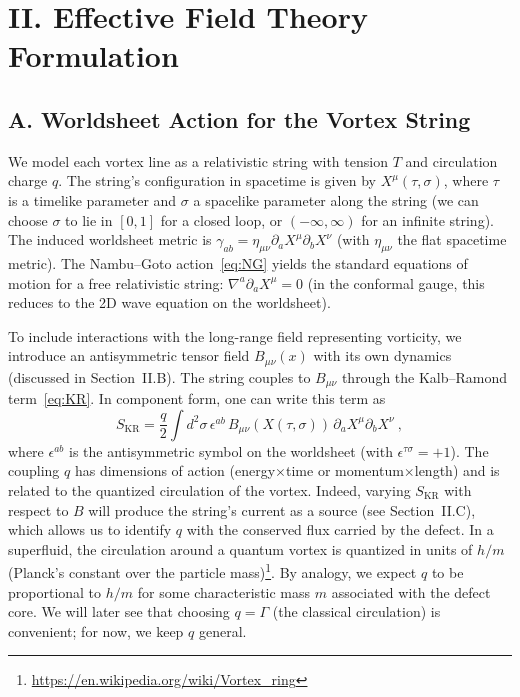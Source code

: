 \documentclass[12pt]{article}
\begin{document}
\section*{II. Effective Field Theory Formulation}

\subsection*{A. Worldsheet Action for the Vortex String}

We model each vortex line as a relativistic string with tension $T$ and circulation charge $q$. The string's configuration in spacetime is given by $X^\mu(\tau,\sigma)$, where $\tau$ is a timelike parameter and $\sigma$ a spacelike parameter along the string (we can choose $\sigma$ to lie in $[0,1]$ for a closed loop, or $(-\infty,\infty)$ for an infinite string). The induced worldsheet metric is $\gamma_{ab} = \eta_{\mu\nu}\partial_a X^\mu \partial_b X^\nu$ (with $\eta_{\mu\nu}$ the flat spacetime metric). The Nambu--Goto action~\eqref{eq:NG} yields the standard equations of motion for a free relativistic string: $\nabla^a \partial_a X^\mu = 0$ (in the conformal gauge, this reduces to the 2D wave equation on the worldsheet).

To include interactions with the long-range field representing vorticity, we introduce an antisymmetric tensor field $B_{\mu\nu}(x)$ with its own dynamics (discussed in Section~II.B). The string couples to $B_{\mu\nu}$ through the Kalb--Ramond term~\eqref{eq:KR}. In component form, one can write this term as
\begin{equation}
S_{\text{KR}} = \frac{q}{2} \int d^2\sigma\, \epsilon^{ab}\, B_{\mu\nu}(X(\tau,\sigma))\, \partial_a X^\mu \partial_b X^\nu~,
\label{eq:KRcomp}
\end{equation}
where $\epsilon^{ab}$ is the antisymmetric symbol on the worldsheet (with $\epsilon^{\tau\sigma}=+1$). The coupling $q$ has dimensions of action (energy$\times$time or momentum$\times$length) and is related to the quantized circulation of the vortex. Indeed, varying $S_{\text{KR}}$ with respect to $B$ will produce the string's current as a source (see Section~II.C), which allows us to identify $q$ with the conserved flux carried by the defect. In a superfluid, the circulation around a quantum vortex is quantized in units of $h/m$ (Planck's constant over the particle mass)\footnote{\url{https://en.wikipedia.org/wiki/Vortex_ring}}. By analogy, we expect $q$ to be proportional to $h/m$ for some characteristic mass $m$ associated with the defect core. We will later see that choosing $q = \Gamma$ (the classical circulation) is convenient; for now, we keep $q$ general.
\end{document}

